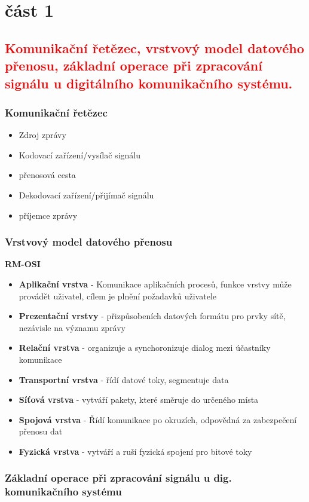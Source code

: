 \section{část 1}
\subsection{\textcolor{red}{Komunikační řetězec, vrstvový model datového přenosu, základní operace při zpracování signálu u digitálního komunikačního systému.}}
\subsubsection*{Komunikační řetězec}
\begin{itemize}
    \item Zdroj zprávy
    \item Kodovací zařízení/vysílač signálu
    \item  přenosová cesta
    \item  Dekodovací zařízení/přijímač signálu
    \item příjemce zprávy
\end{itemize}
\subsubsection*{Vrstvový model datového přenosu}
\textbf{RM-OSI}
\begin{itemize}
    \item \textbf{Aplikační vrstva} - Komunikace aplikačních procesů, funkce vrstvy může provádět uživatel, cílem je plnění požadavků uživatele
    \item \textbf{Prezentační vrstvy} - přizpůsobeních datových formátu pro prvky sítě, nezávisle na významu zprávy
    \item \textbf{Relační vrstva} - organizuje a synchoronizuje dialog mezi účastníky komunikace
    \item \textbf{Transportní vrstva} - řídí datové toky, segmentuje data
    \item \textbf{Síťová vrstva} - vytváří pakety, které směruje do určeného místa
    \item \textbf{Spojová vrstva} - Řídí komunikace po okruzích, odpovědná za zabezpečení přenosu dat
    \item \textbf{Fyzická vrstva} - vytváří a ruší fyzická spojení pro bitové toky
\end{itemize}

\subsubsection*{Základní operace při zpracování signálu u dig. komunikačního systému}

